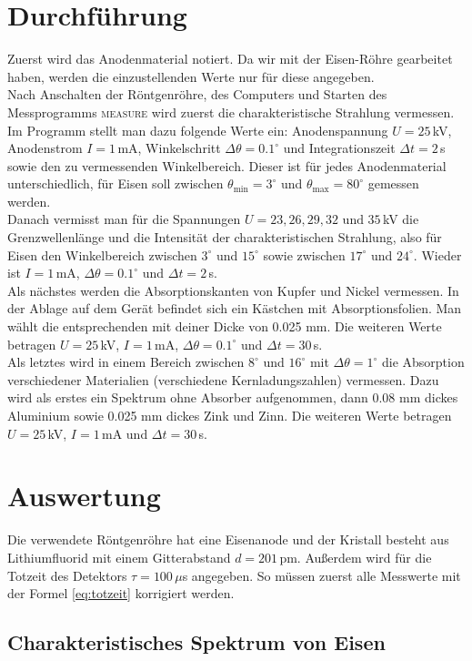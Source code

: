 \documentclass[12pt,a4paper,titlepage,headinclude,bibtotoc]{scrartcl}
\begin{document}
\section{Durchführung}
\label{sec:durchfuehrung}
Zuerst wird das Anodenmaterial notiert.
Da wir mit der Eisen-Röhre gearbeitet haben, werden die einzustellenden Werte nur für diese angegeben.\\
Nach Anschalten der Röntgenröhre, des Computers und Starten des Messprogramms \textsc{measure} wird zuerst die charakteristische Strahlung vermessen.
Im Programm stellt man dazu folgende Werte ein: Anodenspannung $U=25\,$kV, Anodenstrom $I=1\,$mA, Winkelschritt $\Delta\theta=0.1^\circ$ und Integrationszeit $\Delta t=2\,$s sowie den zu vermessenden Winkelbereich.
Dieser ist für jedes Anodenmaterial unterschiedlich, für Eisen soll zwischen $\theta_\text{min}=3^\circ$ und $\theta_\text{max}=80^\circ$ gemessen werden.\\
Danach vermisst man für die Spannungen $U=23, 26, 29, 32 \text{ und } 35\,$kV die Grenzwellenlänge und die Intensität der charakteristischen Strahlung, also für Eisen den Winkelbereich zwischen $3^\circ$ und $15^\circ$ sowie zwischen $17^\circ$ und $24^\circ$.
Wieder ist $I=1\,$mA, $\Delta\theta=0.1^\circ$ und $\Delta t=2\,$s.\\
Als nächstes werden die Absorptionskanten von Kupfer und Nickel vermessen.
In der Ablage auf dem Gerät befindet sich ein Kästchen mit Absorptionsfolien.
Man wählt die entsprechenden mit deiner Dicke von 0.025 mm.
Die weiteren Werte betragen $U=25\,$kV, $I=1\,$mA, $\Delta\theta=0.1^\circ$ und $\Delta t=30\,$s.\\
Als letztes wird in einem Bereich zwischen $8^\circ$ und $16^\circ$ mit $\Delta\theta=1^\circ$ die Absorption verschiedener Materialien (verschiedene Kernladungszahlen) vermessen.
Dazu wird als erstes ein Spektrum ohne Absorber aufgenommen, dann 0.08 mm dickes Aluminium sowie 0.025 mm dickes Zink und Zinn.
Die weiteren Werte betragen $U=25\,$kV, $I=1\,$mA und $\Delta t=30\,$s.

\section{Auswertung}
\label{sec:auswertung}
Die verwendete Röntgenröhre hat eine Eisenanode und der Kristall besteht aus Lithiumfluorid mit einem Gitterabstand $d=201\,$pm.
Außerdem wird für die Totzeit des Detektors $\tau=100\,\mu$s angegeben.
So müssen zuerst alle Messwerte mit der Formel \eqref{eq:totzeit} korrigiert werden.
\subsection{Charakteristisches Spektrum von Eisen}
\end{document}
